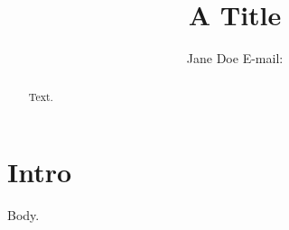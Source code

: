 \documentclass{aastex701}
\begin{document}
\title{A Title}
\author{Jane Doe \newline E-mail: }
\begin{abstract}
Text.
\end{abstract}
\section{Intro} Body.
\end{document}
